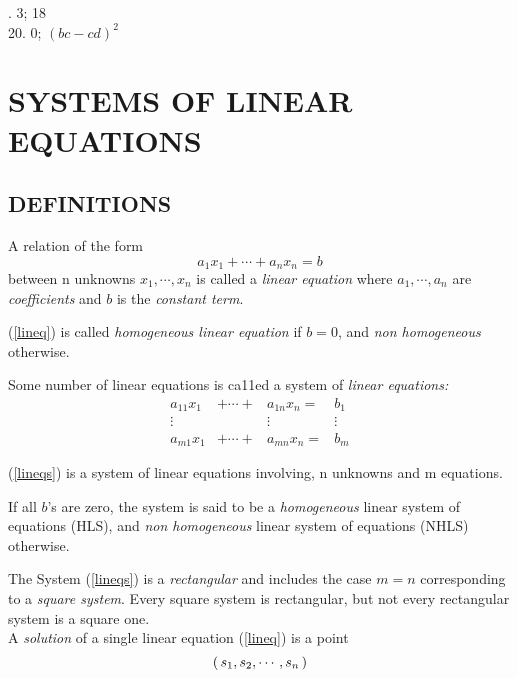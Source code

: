 \documentclass[11pt]{amsbook}
\begin{document}

. 3; 18 \\
20. 0; $(bc-cd)^2$

\section{SYSTEMS OF LINEAR EQUATIONS}

\subsection{DEFINITIONS}

\begin{defn}
  A relation of the form
  \begin{equation}
    \label{lineq}
    a_1x_1 + \cdots + a_nx_n = b
  \end{equation}
  between n unknowns $x_1 , \cdots , x_n$ is called a {\itshape linear equation} 
  where $a_1 , \cdots , a_n$ are  {\itshape coefficients} and $b$ is the {\itshape constant term}.	
\end{defn}

\begin{defn}
  (\ref{lineq}) is called {\itshape homogeneous linear equation} if $b=0$, 
  and {\itshape non homogeneous} otherwise.
\end{defn}
 
\begin{defn}
  Some number of linear equations is ca11ed a system of
  {\itshape linear equations:}
  \begin{equation}
    \label{lineqs}
    \begin{matrix}
      a_{11}x_1 &+ \cdots + &a_{1n}x_n = &b_1 \\
      \vdots &&\vdots &\vdots \\
      a_{m1}x_1 &+ \cdots + &a_{mn}x_n = &b_m
    \end{matrix}
  \end{equation}
\end{defn}
(\ref{lineqs}) is a system of linear equations involving, n unknowns and m equations.
\begin{defn}
  If all $b$'s are zero, the system is said to be a {\itshape homogeneous} linear system of equations (HLS), 
  and {\itshape non homogeneous} linear system of equations (NHLS) otherwise.
\end{defn}
The System (\ref{lineqs}) is a {\itshape rectangular} and includes the case $m=n$ 
corresponding to a {\itshape square system}. Every square system is rectangular, but not 
every rectangular system is a square one.\\
\indent A {\itshape solution} of a single linear equation (\ref{lineq}) is a point $$ \left( \, s_1,s_2,\cdots,s_n \, \right) $$ 
\end{document}
